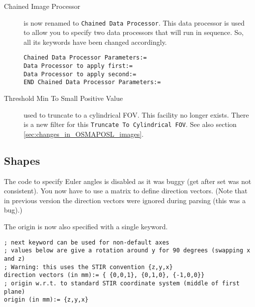 \documentclass{article}
\begin{document}
\begin{description}
\item[Chained Image Processor]
is now renamed to \texttt{Chained Data Processor}. 
This data processor is used to allow you to specify two
data processors that will run in sequence. So, all its keywords have
been changed accordingly.
\begin{verbatim}
Chained Data Processor Parameters:=
Data Processor to apply first:= 
Data Processor to apply second:=
END Chained Data Processor Parameters:=
\end{verbatim}

\item[Threshold Min To Small Positive Value]
used to truncate to a cylindrical FOV. This facility no longer
exists. There is a new filter for this \texttt{Truncate To Cylindrical FOV}.
See also section \ref{sec:changes_in_OSMAPOSL_images}.
\end{description}


\subsection{Shapes}
The code to specify Euler angles is disabled
as it was buggy (get after set was not consistent).
You now have to  use a matrix to define direction vectors. 
(Note that in previous version the direction
vectors were ignored during parsing (this was a bug).)

The origin is now also specified with a single keyword.
\begin{verbatim}
; next keyword can be used for non-default axes
; values below are give a rotation around y for 90 degrees (swapping x and z)
; Warning: this uses the STIR convention {z,y,x}
direction vectors (in mm):= { {0,0,1}, {0,1,0}, {-1,0,0}}
; origin w.r.t. to standard STIR coordinate system (middle of first plane)
origin (in mm):= {z,y,x}
\end{verbatim}
\end{document}
